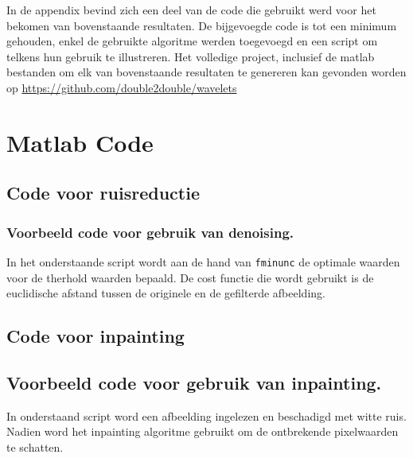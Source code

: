 


\begin{appendices}

In de appendix bevind zich een deel van de code die gebruikt werd voor het bekomen van bovenstaande resultaten.
De bijgevoegde code is tot een minimum gehouden, enkel de gebruikte algoritme werden toegevoegd en een script om telkens hun gebruik te illustreren.
Het volledige project, inclusief de matlab bestanden om elk van bovenstaande resultaten te genereren kan gevonden worden op \href{https://github.com/double2double/wavelets}{https://github.com/double2double/wavelets}




\section*{Matlab Code}


\subsection*{Code voor ruisreductie}


\subsubsection*{Voorbeeld code voor gebruik van denoising.}
In het onderstaande script wordt aan de hand van \verb|fminunc| de optimale waarden voor de therhold waarden bepaald.
De cost functie die wordt gebruikt is de euclidische afstand tussen de originele en de gefilterde afbeelding.


\subsection*{Code voor inpainting}

\subsection*{Voorbeeld code voor gebruik van inpainting.}
In onderstaand script word een afbeelding ingelezen en beschadigd met witte ruis. Nadien word het inpainting algoritme gebruikt om de ontbrekende pixelwaarden te schatten.



\end{appendices}